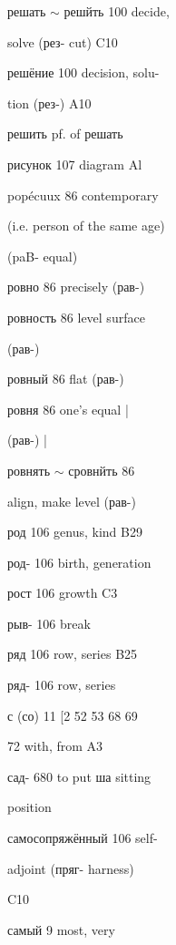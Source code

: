 \clearpage
\thispagestyle{plain}
\begingroup
\cyrillicfont
\fontsize{7.25}{8.25}\selectfont
\setlength{\parindent}{0pt}
\setlength{\parskip}{0pt}
\setlength{\emergencystretch}{1.5em}
\noindent
\begin{minipage}[t]{0.475\textwidth}
\raggedright
\noindent решать $\sim$ решйть 100 decide,\par
\noindent solve (рез- cut) C10\par
\noindent решёние 100 decision, solu-\par
\noindent tion (рез-) A10\par
\noindent решить pf. of решать\par
\noindent рисунок 107 diagram Al\par
\noindent popécuux 86 contemporary\par
\noindent (i.e. person of the same age)\par
\noindent (paB- equal)\par
\noindent ровно 86 precisely (рав-)\par
\noindent ровность 86 level surface\par
\noindent (рав-)\par
\noindent ровный 86 flat (рав-)\par
\noindent ровня 86 one's equal |\par
\noindent (рав-) |\par
\noindent ровнять $\sim$ сровнйть 86\par
\noindent align, make level (рав-)\par
\noindent род 106 genus, kind B29\par
\noindent род- 106 birth, generation\par
\noindent рост 106 growth C3\par
\noindent рыв- 106 break\par
\noindent ряд 106 row, series B25\par
\noindent ряд- 106 row, series\par
\noindent с (со) 11 [2 52 53 68 69\par
{} 72 with, from A3\par
\noindent сад- 680 to put ша sitting\par
\noindent position\par
\noindent самосопряжённый 106 self-\par
\noindent adjoint (пряг- harness)\par
\noindent C10\par
\noindent самый 9 most, very\par

\end{minipage}
